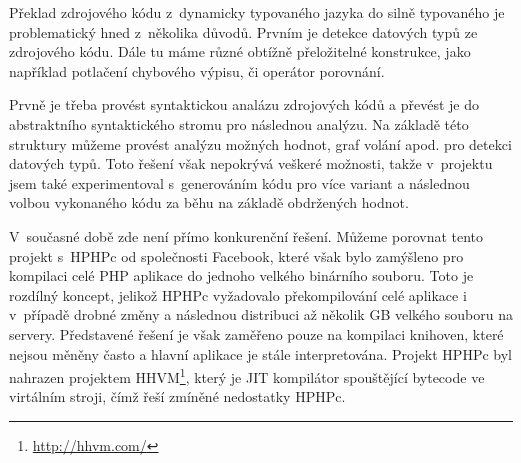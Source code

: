 \documentclass[czech]{ExcelAtFIT}
\begin{document}
		Překlad zdrojového kódu z~dynamicky typovaného jazyka do silně typovaného je problematický hned z~několika důvodů. Prvním je detekce datových typů ze zdrojového kódu. Dále tu máme různé obtížně přeložitelné konstrukce, jako například potlačení chybového výpisu, či operátor porovnání.


		Prvně je třeba provést syntaktickou analázu zdrojových kódů a převést je do abstraktního syntaktického stromu pro následnou analýzu. Na základě této struktury můžeme provést analýzu možných hodnot, graf volání apod. pro detekci datových typů. Toto řešení však nepokrývá veškeré možnosti, takže v~projektu jsem také experimentoval s~generováním kódu pro více variant a následnou volbou vykonaného kódu za běhu na základě obdržených hodnot.







		V~současné době zde není přímo konkurenční ře\-še\-ní. Můžeme porovnat tento projekt s~HPHPc od společnosti Facebook, které však bylo zamýšleno pro kompilaci celé PHP aplikace do jednoho velkého bi\-nár\-ní\-ho sou\-bo\-ru. Toto je rozdílný koncept, jelikož HPHPc vy\-ža\-do\-va\-lo překompilování celé aplikace i v~případě drobné změny a následnou distribuci až několik GB velkého souboru na servery. Představené řešení je však zaměřeno pouze na kompilaci knihoven, které nejsou měněny často a hlavní aplikace je stále interpretována. Projekt HPHPc byl nahrazen projektem HHVM\footnote{\url{http://hhvm.com/}}, který je JIT kompilátor spouštějící bytecode ve virtálním stroji, čímž řeší zmíněné nedostatky HPHPc\cite{hphpcHipHop}.
\end{document}
